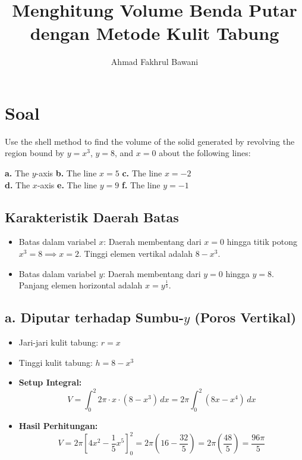 \documentclass[12pt,a4paper]{article}
\title{Menghitung Volume Benda Putar dengan Metode Kulit Tabung}
\author{Ahmad Fakhrul Bawani}
\date{}
\begin{document}
\maketitle

\section*{Soal}

Use the shell method to find the volume of the solid generated by revolving the region bound by $y = x^3$, $y = 8$, and $x = 0$ about the following lines:
\begin{center}
  \textbf{a.} The $y$-axis \quad \textbf{b.} The line $x = 5$ \quad \textbf{c.} The line $x = -2$ \\
  \textbf{d.} The $x$-axis \quad \textbf{e.} The line $y = 9$ \quad \textbf{f.} The line $y = -1$
\end{center}

\subsection*{Karakteristik Daerah Batas}
\begin{itemize}
  \item Batas dalam variabel $x$: Daerah membentang dari $x = 0$ hingga titik potong $x^3 = 8 \implies x = 2$. Tinggi elemen vertikal adalah $8 - x^3$.
  \item Batas dalam variabel $y$: Daerah membentang dari $y = 0$ hingga $y = 8$. Panjang elemen horizontal adalah $x = y^{\frac{1}{3}}$.
\end{itemize}

\subsection*{a. Diputar terhadap Sumbu-$y$ (Poros Vertikal)}
\begin{itemize}
  \item Jari-jari kulit tabung: $r = x$
  \item Tinggi kulit tabung: $h = 8 - x^3$
  \item \textbf{Setup Integral:}
    \begin{equation*}
      V = \int_{0}^{2} 2\pi \cdot x \cdot (8 - x^3) \, dx = 2\pi \int_{0}^{2} (8x - x^4) \, dx
    \end{equation*}
  \item \textbf{Hasil Perhitungan:}
    \begin{equation*}
      V = 2\pi \left[ 4x^2 - \frac{1}{5}x^5 \right]_{0}^{2} = 2\pi \left( 16 - \frac{32}{5} \right) = 2\pi \left( \frac{48}{5} \right) = \frac{96\pi}{5}
    \end{equation*}
\end{itemize}
\end{document}
